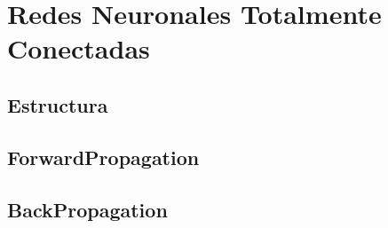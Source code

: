 \chapter{Redes Neuronales Totalmente Conectadas}

\section{Estructura}
\section{ForwardPropagation}
\section{BackPropagation}